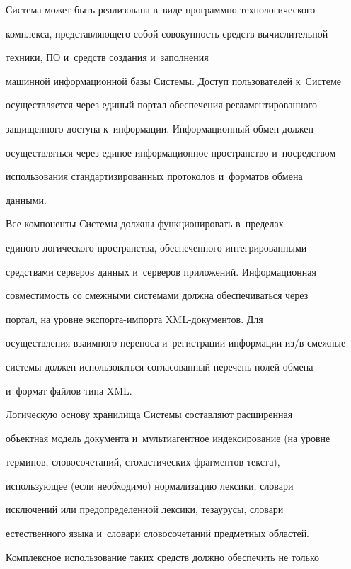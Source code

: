 Система может быть реализована в~виде про\-граммно-тех\-но\-ло\-ги\-че\-ско\-го 


комплекса, представляющего собой совокупность средств вычислительной 


техники, ПО и~средств создания и~заполнения 


машинной информационной базы Системы. Доступ пользователей к~Системе 


осуществляется через единый портал обеспечения регламентированного 


защищенного доступа к~информации. Информационный обмен должен 


осуществляться через единое информационное пространство и~посредством 


использования стандартизированных протоколов и~форматов обмена 


данными.


      


     Все компоненты Системы должны функционировать в~пределах 


единого логического пространства, обеспеченного интегрированными 


средствами серверов данных и~серверов приложений. Информационная 


совместимость со смежными системами должна обеспечиваться через 


портал, на уровне экс\-пор\-та-им\-пор\-та XML-до\-ку\-мен\-тов. Для 


осуществления взаимного переноса и~регистрации информации из/в смежные 


системы должен использоваться согласованный перечень полей обмена 


и~формат файлов типа XML.


     


     Логическую основу хранилища Системы составляют расширенная 


объектная модель документа и~мультиагентное индексирование (на уровне 


терминов, словосочетаний, стохастических фрагментов текста), 


использующее (если необходимо) нормализацию лексики, словари 


исключений или предопределенной лексики, тезаурусы, словари 


естественного языка и~словари словосочетаний предметных областей. 


Комплексное использование таких средств должно обеспечить не только 


